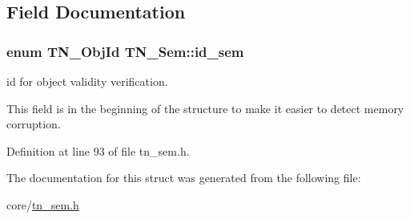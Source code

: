 \subsection{Field Documentation}
\hypertarget{structTN__Sem_a810526e9b3d5595278ebb70e59a128e1}{
\subsubsection[{id\+\_\+sem}]{\setlength{\rightskip}{0pt plus 5cm}enum {\bf T\+N\+\_\+\+Obj\+Id} T\+N\+\_\+\+Sem\+::id\+\_\+sem}}\label{structTN__Sem_a810526e9b3d5595278ebb70e59a128e1}


id for object validity verification. 

This field is in the beginning of the structure to make it easier to detect memory corruption. 

Definition at line 93 of file tn\+\_\+sem.\+h.



The documentation for this struct was generated from the following file\+:\begin{DoxyCompactItemize}
\item 
core/\hyperlink{tn__sem_8h}{tn\+\_\+sem.\+h}\end{DoxyCompactItemize}
